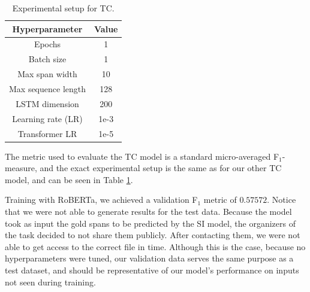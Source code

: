 \documentclass[11pt]{article}
\newcommand{\pol}[1]{{\fontfamily{pcr}\selectfont#1}}
\begin{document}
\begin{table}[h]
\centering
  \begin{tabular}{c c}
    \hline
    \textbf{Hyperparameter} & \textbf{Value} \\
    \hline
    Epochs & 1 \\
    Batch size & 1 \\
    Max span width & 10 \\
    Max sequence length & 128 \\
    \pol{LSTM} dimension & 200 \\
    Learning rate (LR) & 1e-3 \\
    Transformer LR & 1e-5 \\
    \hline
  \end{tabular}
  \caption{Experimental setup for \pol{TC}.}
  \label{table:tc-params}
\end{table}

The metric used to evaluate the TC model is a standard micro-averaged F$_1$-measure, and the exact experimental setup is the same as for our other \pol{TC} model, and can be seen in Table \ref{table:tc-params}. 

Training with \pol{RoBERTa}, we achieved a validation F$_1$ metric of $0.57572$. Notice that we were not able to generate results for the test data. Because the model took as input the gold spans to be predicted by the \pol{SI} model, the organizers of the task decided to not share them publicly. After contacting them, we were not able to get access to the correct file in time. Although this is the case, because no hyperparameters were tuned, our validation data serves the same purpose as a test dataset, and should be representative of our model's performance on inputs not seen during training.
\end{document}
